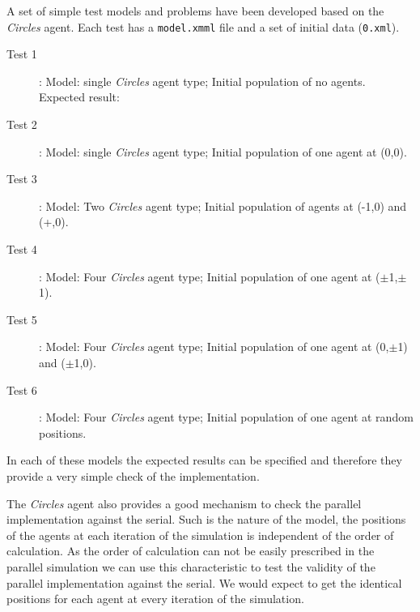 A set of simple test models and problems have been developed based on the \textsl{Circles} agent. Each test has a \texttt{model.xmml} file and a set of initial data (\texttt{0.xml}).
\begin{description}
	\item [Test 1]: Model: single \textsl{Circles} agent type; Initial population of no agents. Expected result:
	\item [Test 2]: Model: single \textsl{Circles} agent type; Initial population of one agent at (0,0).
	\item [Test 3]: Model: Two \textsl{Circles} agent type; Initial population of agents at (-1,0) and (+,0).
	\item [Test 4]: Model: Four \textsl{Circles} agent type; Initial population of one agent at ($\pm$1,$\pm$1).
	\item [Test 5]: Model: Four \textsl{Circles} agent type; Initial population of one agent at (0,$\pm$1) and ($\pm$1,0).
	\item [Test 6]: Model: Four \textsl{Circles} agent type; Initial population of one agent at random positions.
	\end{description}
In each of these models the expected results can be specified and therefore they provide a very simple check of the implementation.

The \textsl{Circles} agent also provides a good mechanism to check the parallel implementation against the serial. Such is the nature of the model, the positions of the agents at each iteration of the simulation is independent of the order of calculation. As the order of calculation can not be easily prescribed in the parallel simulation we can use this characteristic to test the validity of the parallel implementation against the serial. We would expect to get the identical positions for each agent at every iteration of the simulation.

